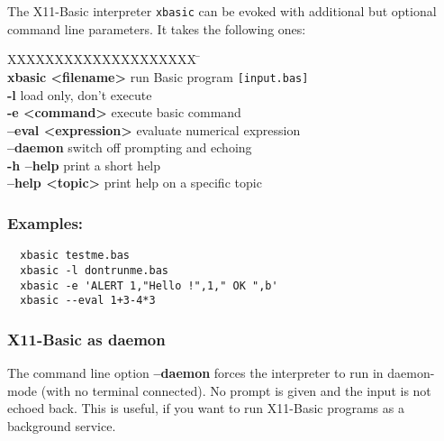 The X11-Basic interpreter \verb|xbasic| can be evoked with  additional but
optional command line parameters. It takes the following ones:

\begin{tabbing}
XXXXXXXXXXXXXXXXXXXX \=\kill\\
  {\bf xbasic <filename> }  \> run Basic program \verb|[input.bas]|\\
  {\bf -l		  } \> load only, don't execute\\
  {\bf -e <command>	  }\> execute basic command \\
  {\bf --eval <expression>}   \> evaluate numerical expression  \\
  {\bf --daemon 	  } \> switch off prompting and echoing\\
  {\bf -h --help	  } \> print a short help \\
  {\bf --help <topic>	  } \> print help on a specific topic\\
\end{tabbing}

\begin{mdframed}[hidealllines=true,backgroundcolor=black!20]
\subsubsection*{Examples:}
\begin{verbatim}
  xbasic testme.bas
  xbasic -l dontrunme.bas
  xbasic -e 'ALERT 1,"Hello !",1," OK ",b'
  xbasic --eval 1+3-4*3
\end{verbatim}
\end{mdframed}

\subsubsection*{X11-Basic as daemon}

The  command line option {\normalfont \bf --daemon} forces the interpreter to run in
daemon-mode (with no terminal connected).  No prompt is given and the 
input is not echoed back. This is useful, if you want to run X11-Basic
programs as a background service.
  
%

